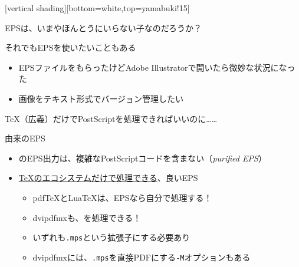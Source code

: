 \documentclass[14pt,dvipdfmx,uplatex]{beamer}
\begin{document}
[vertical shading][bottom=white,top=yamabuki!15]

\begin{frame}[plain]
  \begin{center}
    \color{black}\yasagoth
    EPSは、いまやほんとうにいらない子なのだろうか？
  \end{center}
\end{frame}

\begin{frame}[t,fragile=singleslide]{\inhibitglue それでもEPSを使いたいこともある}
  \sffamily
  \begin{itemize}
    \item EPSファイルをもらったけどAdobe Illustratorで開いたら微妙な状況になった
    \item 画像をテキスト形式でバージョン管理したい
  \end{itemize}
\end{frame}

\begin{frame}[plain]
  \begin{center}
    \color{black}\yasagoth
    \TeX{}（広義）だけでPostScriptを処理できればいいのに……
  \end{center}
\end{frame}

\begin{frame}[t,fragile=singleslide]{\inhibitglue {}由来のEPS}
  \sffamily
  \begin{itemize}
    \item {}のEPS出力は、複雑なPostScriptコードを含まない（\textit{purified EPS}）
    \item \underline{\TeX{}のエコシステムだけで処理できる}、{\color{red}良いEPS}
    \begin{itemize}
      \item pdf\TeX{}とLua\TeX{}は、EPSなら自分で処理する！
      \item dvipdfmxも、を処理できる！
      \item いずれも\texttt{.mps}という拡張子にする必要あり
      \item dvipdfmxには、\texttt{.mps}を直接PDFにする\texttt{-M}オプションもある
    \end{itemize}
  \end{itemize}
\end{frame}
\end{document}
